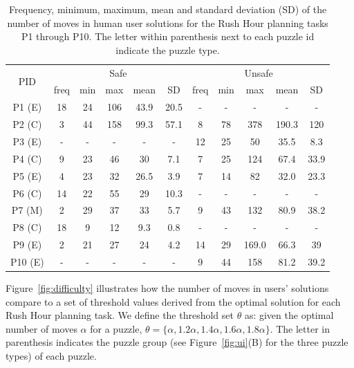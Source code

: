 \begin{table}[tpb]
\caption{Frequency, minimum, maximum, mean and standard deviation  (SD) of the number of moves in human user solutions for the Rush Hour planning tasks P1 through P10. The letter within parenthesis next to each puzzle id indicate the puzzle type.}
\begin{tabular}{|c|ccccc|ccccc|}
\hline
\multirow{2}{*}{PID} & \multicolumn{5}{c|}{Safe} & \multicolumn{5}{c|}{Unsafe} \\ \cline{2-11} 
 & \multicolumn{1}{c|}{freq} & \multicolumn{1}{c|}{min} & \multicolumn{1}{c|}{max} & \multicolumn{1}{c|}{mean} & SD & \multicolumn{1}{c|}{freq} & \multicolumn{1}{c|}{min} & \multicolumn{1}{c|}{max} & \multicolumn{1}{c|}{mean} & SD \\ \hline
P1 (E) & 18 & 24 & 106 & 43.9 & 20.5 & - & - & - & - & - \\ \cline{1-1}
P2 (C) & 3 & 44 & 158 & 99.3 & 57.1 & 8 & 78 & 378 & 190.3 & 120 \\ \cline{1-1}
P3 (E) & - & - & - & - & - & 12 & 25 & 50 & 35.5 & 8.3 \\ \cline{1-1}
P4 (C) & 9 & 23 & 46 & 30 & 7.1 & 7 & 25 & 124 & 67.4 & 33.9 \\ \cline{1-1}
P5 (E) & 4 & 23 & 32 & 26.5 & 3.9 & 7 & 14 & 82 & 32.0 & 23.3 \\ \cline{1-1}
P6 (C) & 14 & 22 & 55 & 29 & 10.3 & - & - & - & - & - \\ \cline{1-1}
P7 (M) & 2 & 29 & 37 & 33 & 5.7 & 9 & 43 & 132 & 80.9 & 38.2 \\ \cline{1-1}
P8 (C) & 18 & 9 & 12 & 9.3 & 0.8 & - & - & - & - & - \\ \cline{1-1}
P9 (E) & 2 & 21 & 27 & 24 & 4.2 & 14 & 29 & 169.0 & 66.3 & 39 \\ \cline{1-1}
P10 (E) & - & - & - & - & - & 9 & 44 & 158 & 81.2 & 39.2 \\ \hline
\end{tabular}
\label{tab:safeunsafe}
\end{table}

Figure~\ref{fig:difficulty} illustrates how the number of moves in users' solutions compare to a set of threshold values derived from the optimal solution for each Rush Hour planning task. 
We define the threshold set $\theta$ as: given the optimal number of moves  $\alpha$ for a puzzle, $\theta=\lbrace \alpha, 1.2\alpha, 1.4\alpha, 1.6\alpha, 1.8\alpha\rbrace$. The letter in parenthesis indicates the puzzle group (see Figure~\ref{fig:ui}(B) for the three puzzle types) of each puzzle.

